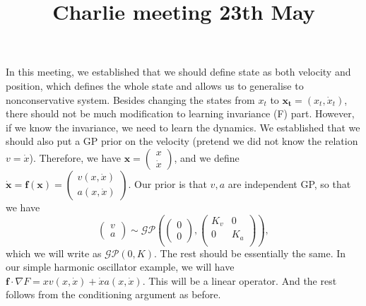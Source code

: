 \documentclass{article}
\title{\vspace{-3cm}Charlie meeting 23th May\vspace{-3em}}
\author{}
\date{}
\begin{document}
\maketitle
In this meeting, we established that we should define state as both velocity and position, which defines the whole state and allows us to generalise to non\-conservative system.
Besides changing the states from $x_t$ to $\mathbf{x_t}=(x_t, \dot{x}_t)$, there should not be much modification to learning invariance (F) part. 
However, if we know the invariance, we need to learn the dynamics. 
We established that we should also put a GP prior on the velocity (pretend we did not know the relation $v = \dot{x}$).
Therefore, we have $\mathbf{x} = \begin{pmatrix}
  x\\
  \dot{x}
\end{pmatrix}$, and we define $\mathbf{\dot{x}} = \mathbf{f}(\mathbf{x}) = \begin{pmatrix}
  v(x, \dot{x}) \\
  a(x, \dot{x})
\end{pmatrix}$.
Our prior is that $v, a$ are independent GP, so that we have 
$$
\begin{pmatrix}
  v\\a
\end{pmatrix}
\sim
\mathcal{GP}
\left(
\begin{pmatrix}
  0\\0
\end{pmatrix}, 
\begin{pmatrix}
  K_v & 0 \\
  0   & K_a \\ 
\end{pmatrix}
\right)
,
$$
which we will write as $\mathcal{GP}(0, K).$
The rest should be essentially the same.
In our simple harmonic oscillator example, we will have $\mathbf{f}\cdot \nabla F=xv(x, \dot{x})+\dot{x}a(x, \dot{x}).$
This will be a linear operator. 
And the rest follows from the conditioning argument as before.
\end{document}
